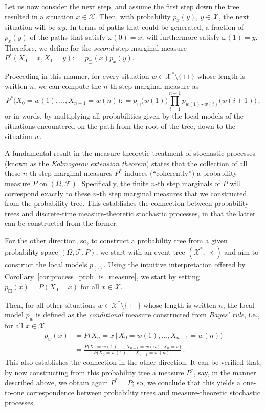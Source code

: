 \documentclass[11pt]{book}
\newcommand{\states}{\mathcal{X}}
\newcommand{\coloneqq}{:\!=}
\begin{document}
Let us now consider the next step, and assume the first step down the tree resulted in a situation $x\in\states$. Then, with probability $p_x(y)$, $y\in\states$, the next situation will be $xy$. In terms of paths that could be generated, a fraction of $p_x(y)$ of the paths that satisfy $\omega(0)=x$, will furthermore satisfy $\omega(1)=y$. Therefore, we define for the \emph{second}-step marginal measure $P^*(X_0=x,X_1=y)\coloneqq p_\Box(x)p_x(y)$.

Proceeding in this manner, for every situation $w\in\states^*\setminus\{\Box\}$ whose length is written $n$, we can compute the $n$-th step marginal measure as
\begin{equation*}
P^*\bigl(X_0=w(1),\ldots,X_{n-1}=w(n)\bigr) \coloneqq p_\Box\bigl(w(1)\bigr)\prod_{i=1}^{n-1} p_{w(1)\cdots w(i)}\bigl(w(i+1)\bigr)\,,
\end{equation*}
or in words, by multiplying all probabilities given by the local models of the situations encountered on the path from the root of the tree, down to the situation $w$.

A fundamental result in the measure-theoretic treatment of stochastic processes (known as the \emph{Kolmogorov extension theorem}) states that the collection of all these $n$-th step marginal measures $P^*$ induces (``coherently'') a probability measure $P$ on $(\Omega,\mathcal{F})$. Specifically, the finite $n$-th step marginals of $P$ will correspond exactly to these $n$-th step marginal measures that we constructed from the probability tree. This establishes the connection between probability trees and discrete-time measure-theoretic stochastic processes, in that the latter can be constructed from the former.

For the other direction, so, to construct a probability tree from a given probability space $(\Omega,\mathcal{F},P)$, we start with an event tree $(\states^*,\prec)$ and aim to construct the local models $p_{(\cdot)}$. Using the intuitive interpretation offered by Corollary~\ref{cor:process_prob_is_measure}, we start by setting $p_\Box(x)=P(X_0=x)$ for all $x\in\states$.

Then, for all other situations $w\in\states^*\setminus\{\Box\}$ whose length is written $n$, the local model $p_w$ is defined as the \emph{conditional} measure constructed from \emph{Bayes' rule}, i.e., for all $x\in\states$,
\begin{align*}
p_w(x) &= P\bigl( X_n=x\,\big\vert\, X_0=w(1),\ldots,X_{n-1}=w(n) \bigr) \\
 &= \frac{P\bigl(X_0=w(1),\ldots,X_{n-1}=w(n), X_n=x\bigr)}{P\bigl( X_0=w(1),\ldots,X_{n-1}=w(n) \bigr)}\,.
\end{align*}
This also establishes the connection in the other direction. It can be verified that, by now constructing from this probability tree a measure $P^*$, say, in the manner described above, we obtain again $P^*=P$; so, we conclude that this yields a one-to-one correspondence between probability trees and measure-theoretic stochastic processes.
\end{document}
